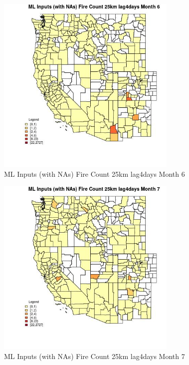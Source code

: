 \begin{figure} 
\centering  
\includegraphics[width=0.77\textwidth]{Code_Outputs/Report_ML_input_PM25_Step4_part_f_de_duplicated_aveswNAs_CountyFire_Count_25km_lag4daysmedianMonth6.jpg} 
\caption{\label{fig:Report_ML_input_PM25_Step4_part_f_de_duplicated_aveswNAsCountyFire_Count_25km_lag4daysmedianMonth6}ML Inputs (with NAs) Fire Count 25km lag4days Month 6} 
\end{figure} 
 

\begin{figure} 
\centering  
\includegraphics[width=0.77\textwidth]{Code_Outputs/Report_ML_input_PM25_Step4_part_f_de_duplicated_aveswNAs_CountyFire_Count_25km_lag4daysmedianMonth7.jpg} 
\caption{\label{fig:Report_ML_input_PM25_Step4_part_f_de_duplicated_aveswNAsCountyFire_Count_25km_lag4daysmedianMonth7}ML Inputs (with NAs) Fire Count 25km lag4days Month 7} 
\end{figure} 
 

